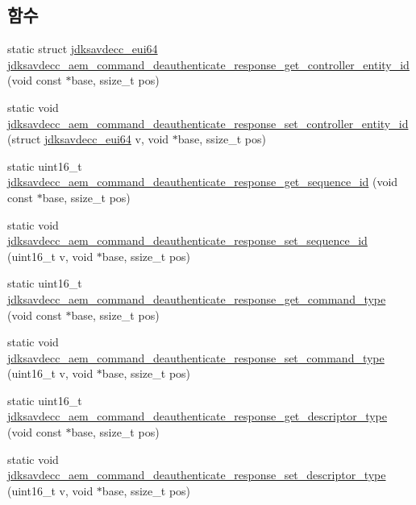 \subsection*{함수}
\begin{DoxyCompactItemize}
\item 
static struct \hyperlink{structjdksavdecc__eui64}{jdksavdecc\+\_\+eui64} \hyperlink{group__command__deauthenticate__response_gaf28a100f0a748334ae44c693db86a3af}{jdksavdecc\+\_\+aem\+\_\+command\+\_\+deauthenticate\+\_\+response\+\_\+get\+\_\+controller\+\_\+entity\+\_\+id} (void const $\ast$base, ssize\+\_\+t pos)
\item 
static void \hyperlink{group__command__deauthenticate__response_ga1b31537e12d08a14ed314aebe20d934f}{jdksavdecc\+\_\+aem\+\_\+command\+\_\+deauthenticate\+\_\+response\+\_\+set\+\_\+controller\+\_\+entity\+\_\+id} (struct \hyperlink{structjdksavdecc__eui64}{jdksavdecc\+\_\+eui64} v, void $\ast$base, ssize\+\_\+t pos)
\item 
static uint16\+\_\+t \hyperlink{group__command__deauthenticate__response_ga027cc89df1971d5a3d340eca25567345}{jdksavdecc\+\_\+aem\+\_\+command\+\_\+deauthenticate\+\_\+response\+\_\+get\+\_\+sequence\+\_\+id} (void const $\ast$base, ssize\+\_\+t pos)
\item 
static void \hyperlink{group__command__deauthenticate__response_gae47864549fb28ae069c5dc2869c2e3c5}{jdksavdecc\+\_\+aem\+\_\+command\+\_\+deauthenticate\+\_\+response\+\_\+set\+\_\+sequence\+\_\+id} (uint16\+\_\+t v, void $\ast$base, ssize\+\_\+t pos)
\item 
static uint16\+\_\+t \hyperlink{group__command__deauthenticate__response_gaf0a862c98257ba5832254fe3b253d02a}{jdksavdecc\+\_\+aem\+\_\+command\+\_\+deauthenticate\+\_\+response\+\_\+get\+\_\+command\+\_\+type} (void const $\ast$base, ssize\+\_\+t pos)
\item 
static void \hyperlink{group__command__deauthenticate__response_gaa8c5862907c97eff8b591c9de10394e5}{jdksavdecc\+\_\+aem\+\_\+command\+\_\+deauthenticate\+\_\+response\+\_\+set\+\_\+command\+\_\+type} (uint16\+\_\+t v, void $\ast$base, ssize\+\_\+t pos)
\item 
static uint16\+\_\+t \hyperlink{group__command__deauthenticate__response_gaf450e8717779a4ce7b04e1d2337a6ff8}{jdksavdecc\+\_\+aem\+\_\+command\+\_\+deauthenticate\+\_\+response\+\_\+get\+\_\+descriptor\+\_\+type} (void const $\ast$base, ssize\+\_\+t pos)
\item 
static void \hyperlink{group__command__deauthenticate__response_ga8e48c2943a39a9e86574938a601d5d7e}{jdksavdecc\+\_\+aem\+\_\+command\+\_\+deauthenticate\+\_\+response\+\_\+set\+\_\+descriptor\+\_\+type} (uint16\+\_\+t v, void $\ast$base, ssize\+\_\+t pos)

\end{DoxyCompactItemize}

